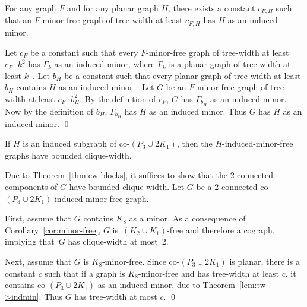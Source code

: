 \documentclass[envcountsame,envcountsect,11pt,a4paper]{llncs}
\renewenvironment{proof}{\begin{Proof}}{\qed\end{Proof}}
\begin{document}
\begin{theorem}
\label{lem:tw->indmin}
For any graph $F$ and for any planar graph $H$, there exists a constant $c_{F, H}$ such that an $F$-minor-free graph of tree-width
at least $c_{F, H}$ has $H$ as an induced minor.
\end{theorem}
\begin{proof}
Let $c_{F}$ be a constant such that every $F$-minor-free graph of tree-width
at least $c_{F} \cdot k^{2}$ has $\Gamma_{k}$ as an induced minor,
where $\Gamma_{k}$ is a planar graph of tree-width at least $k$~\cite{FominGT09}.
Let $b_{H}$ be a constant such that every planar graph of tree-width at least $b_{H}$
contains $H$ as an induced minor~\cite{FKMP95}.
Let $G$ be an $F$-minor-free graph of tree-width at least $c_{F} \cdot b_{H}^{2}$.
By the definition of $c_{F}$, $G$ has $\Gamma_{b_{H}}$ as an induced minor.
Now by the definition of $b_H$, $\Gamma_{b_{H}}$ has $H$ as an induced minor.
Thus $G$ has $H$ as an induced minor.
\end{proof}

\begin{theorem}
\label{thm:german-house_cw}
If $H$ is an induced subgraph of co-$(P_{3} \cup 2 K_{1})$,
then the $H$-induced-minor-free graphs have bounded clique-width.
\end{theorem}
\begin{proof}
Due to Theorem~\ref{thm:cw-blocks}, it suffices to show that the 2-connected components of $G$ have bounded clique-width.
Let $G$ be a 2-connected co-$(P_{3} \cup 2 K_{1})$-induced-minor-free graph.

First, assume that $G$ contains $K_{8}$ as a minor.
As a consequence of Corollary~\ref{cor:minor-free}, $G$ is~$(K_{2} \cup K_{1})$-free and therefore a cograph, implying that~$G$ has clique-width at most~2.

Next, assume that $G$ is $K_{8}$-minor-free. Since co-$(P_3 \cup 2K_1)$ is planar, there is a constant $c$ such that if a graph is $K_{8}$-minor-free and has tree-width at least $c$, it contains co-$(P_3 \cup 2K_1)$ as an induced minor, due to  Theorem~\ref{lem:tw->indmin}. Thus $G$ has tree-width at most $c$.
\end{proof}
\end{document}
